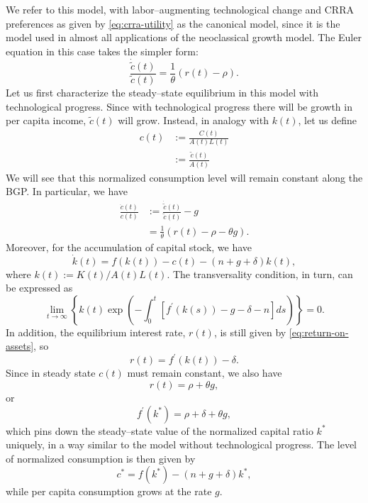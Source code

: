 \documentclass[\topdir/lecture\_notes.tex]{subfiles}
\begin{document}
We refer to this model, with labor--augmenting technological change and CRRA preferences as given by \eqref{eq:crra-utility} as the canonical model, since it is the model used in almost all applications of the neoclassical growth model. The Euler equation in this case takes the simpler form:
\begin{equation}
  \frac{\dot{\tilde{c}}(t)}{\tilde{c}(t)}=\frac{1}{\theta}(r(t)-\rho).
  \label{eq:crra-euler}
\end{equation}
Let us first characterize the steady--state equilibrium in this model with technological progress. Since with technological progress there will be growth in per capita income, \(\tilde{c}(t)\) will grow. Instead, in analogy with \(k(t)\), let us define
\[
  \begin{aligned}
    c(t) & := \frac{C(t)}{A(t) L(t)}    \\
         & := \frac{\tilde{c}(t)}{A(t)}
  \end{aligned}
\]
We will see that this normalized consumption level will remain constant along the BGP. In particular, we have
\[
  \begin{aligned}
    \frac{\dot{c}(t)}{c(t)} & := \frac{\dot{\tilde{c}}(t)}{\tilde{c}(t)}-g \\
                            & =\frac{1}{\theta}(r(t)-\rho-\theta g).
  \end{aligned}
\]
Moreover, for the accumulation of capital stock, we have
\[
  \dot{k}(t)=f(k(t))-c(t)-(n+g+\delta) k(t),
\]
where \(k(t) := K(t) / A(t) L(t)\). The transversality condition, in turn, can be expressed as
\begin{equation}
  \lim _{t \rightarrow \infty}\left\{k(t) \exp \left(-\int_{0}^{t}\left[f^{\prime}(k(s))-g-\delta-n\right] d s\right)\right\}=0.
  \label{eq:transversality-growth}
\end{equation}
In addition, the equilibrium interest rate, \(r(t)\), is still given by \eqref{eq:return-on-assets}, so
\[
  r(t)=f^{\prime}(k(t))-\delta.
\]
Since in steady state \(c(t)\) must remain constant, we also have
\[
  r(t)=\rho+\theta g,
\]
or
\begin{equation}
  f^{\prime}\left(k^{*}\right)=\rho+\delta+\theta g,
  \label{eq:steady--state-k}
\end{equation}
which pins down the steady--state value of the normalized capital ratio \(k^{*}\) uniquely, in a way similar to the model without technological progress. The level of normalized consumption is then given by
\[
  c^{*}=f\left(k^{*}\right)-(n+g+\delta) k^{*},
\]
while per capita consumption grows at the rate \(g\).
\end{document}
